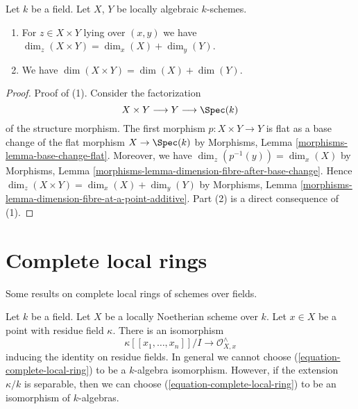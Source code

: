 \begin{lemma}
\label{lemma-dimension-product-locally-algebraic}
Let $k$ be a field. Let $X$, $Y$ be locally algebraic $k$-schemes.
\begin{enumerate}
\item For $z \in X \times Y$ lying over $(x, y)$ we have
$\dim_z(X \times Y) = \dim_x(X) + \dim_y(Y)$.
\item We have $\dim(X \times Y) = \dim(X) + \dim(Y)$.
\end{enumerate}
\end{lemma}

\begin{proof}
Proof of (1). Consider the factorization
$$
X \times Y \longrightarrow Y \longrightarrow \Spec(k)
$$
of the structure morphism. The first morphism $p : X \times Y \to Y$
is flat as a base change of the flat morphism $X \to \Spec(k)$
by Morphisms, Lemma \ref{morphisms-lemma-base-change-flat}.
Moreover, we have $\dim_z(p^{-1}(y)) = \dim_x(X)$ by
Morphisms, Lemma \ref{morphisms-lemma-dimension-fibre-after-base-change}.
Hence $\dim_z(X \times Y) = \dim_x(X) + \dim_y(Y)$ by
Morphisms, Lemma \ref{morphisms-lemma-dimension-fibre-at-a-point-additive}.
Part (2) is a direct consequence of (1).
\end{proof}






\section{Complete local rings}
\label{section-complete-local-rings}

\noindent
Some results on complete local rings of schemes over fields.

\begin{lemma}
\label{lemma-complete-local-ring-structure-as-algebra}
Let $k$ be a field. Let $X$ be a locally Noetherian scheme over $k$.
Let $x \in X$ be a point with residue field $\kappa$.
There is an isomorphism
\begin{equation}
\label{equation-complete-local-ring}
\kappa[[x_1, \ldots, x_n]]/I \longrightarrow \mathcal{O}_{X, x}^\wedge
\end{equation}
inducing the identity on residue fields.
In general we cannot choose (\ref{equation-complete-local-ring})
to be a $k$-algebra isomorphism. However, if the extension $\kappa/k$
is separable, then we can choose
(\ref{equation-complete-local-ring}) to be an isomorphism of $k$-algebras.
\end{lemma}

